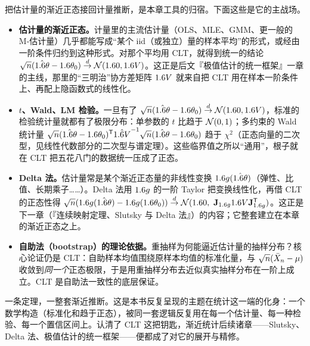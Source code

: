 把估计量的渐近正态接回计量推断，是本章工具的归宿。下面这些是它的主战场。


\begin{itemize}
\item \textbf{估计量的渐近正态。}计量里的主流估计量（OLS、MLE、GMM、更一般的 M-估计量）几乎都能写成``某个 iid（或独立）量的样本平均''的形式，或经由一阶条件归约到这种形式。对那个平均用 CLT，就得到统一的结论 $\sqrt{n}(\hat{1.6\theta}-1.6\theta_0)\overset{d}{\to}\mathcal{N}(1.6 0,1.6 V)$。这正是后文『极值估计的统一框架』一章的主线，那里的``三明治''协方差矩阵 $1.6 V$ 就来自把 CLT 用在样本一阶条件上、再配上隐函数式的线性化。
\item \textbf{$t$、Wald、LM 检验。}一旦有了 $\sqrt{n}(\hat{1.6\theta}-1.6\theta_0)\overset{d}{\to}\mathcal{N}(1.6 0,1.6 V)$，标准的检验统计量就都有了极限分布：单参数的 $t$ 比趋于 $\mathcal{N}(0,1)$；多约束的 Wald 统计量 $\sqrt{n}(\hat{1.6\theta}-1.6\theta_0)^{\mathsf{T}}{\hat{1.6 V}}^{-1}\sqrt{n}(\hat{1.6\theta}-1.6\theta_0)$ 趋于 $\chi^2$（正态向量的二次型，见线性代数部分的二次型与谱定理）。这些临界值之所以``通用''，根子就在 CLT 把五花八门的数据统一压成了正态。
\item \textbf{Delta 法。}估计量常是某个渐近正态量的非线性变换 $1.6 g(\hat{1.6\theta})$（弹性、比值、长期乘子……）。Delta 法用 $1.6 g$ 的一阶 Taylor 把变换线性化，再借 CLT 的正态性得 $\sqrt{n}(1.6 g(\hat{1.6\theta})-1.6 g(1.6\theta_0))\overset{d}{\to}\mathcal{N}(1.6 0,\ \mathbf{J}_{1.6 g}1.6 V\mathbf{J}_{1.6 g}^{\mathsf{T}})$。这正是下一章（『连续映射定理、Slutsky 与 Delta 法』）的内容；它整套建立在本章的渐近正态之上。
\item \textbf{自助法（bootstrap）的理论依据。}重抽样为何能逼近估计量的抽样分布？核心论证仍是 CLT：自助样本均值围绕原样本均值的标准化量，与 $\sqrt{n}(\bar X_n-\mu)$ 收敛到\emph{同一个}正态极限，于是用重抽样分布去近似真实抽样分布在一阶上成立。CLT 是自助法一致性的底层保证。
\end{itemize}

一条定理，一整套渐近推断。这是本书反复呈现的主题在统计这一端的化身：一个数学构造（标准化和趋于正态），被同一套逻辑反复用在每一个估计量、每一种检验、每一个置信区间上。认清了 CLT 这把钥匙，渐近统计后续诸章——Slutsky、Delta 法、极值估计的统一框架——便都成了对它的展开与精修。
